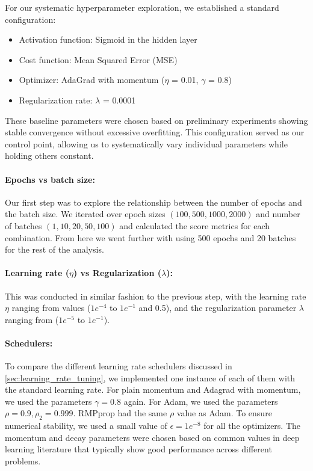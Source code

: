 For our systematic hyperparameter exploration, we established a standard configuration:
\begin{itemize}
    \item Activation function: Sigmoid in the hidden layer
    \item Cost function: Mean Squared Error (MSE)
    \item Optimizer: AdaGrad with momentum (\( \eta \) = 0.01, \( \gamma \) = 0.8)
    \item Regularization rate: \( \lambda \) = 0.0001
\end{itemize}

These baseline parameters were chosen based on preliminary experiments showing stable convergence without excessive overfitting. This configuration served as our control point, allowing us to systematically vary individual parameters while holding others constant.

\paragraph*{Epochs vs batch size:}
Our first step was to explore the relationship between the number of epochs and the batch size. We iterated over epoch sizes \( (100, 500, 1000, 2000) \) and number of batches \( (1, 10, 20, 50, 100) \) and calculated the score metrics for each combination. From here we went further with using 500 epochs and 20 batches for the rest of the analysis.

\paragraph*{Learning rate (\( \eta \)) vs Regularization (\( \lambda \)):}
This was conducted in similar fashion to the previous step, with the learning rate \( \eta \) ranging from values (\( 1e^{-4} \) to \( 1e^{-1} \) and 0.5), and the regularization parameter \( \lambda \) ranging from (\( 1e^{-5} \) to \( 1e^{-1} \)).

\paragraph*{Schedulers:}\label{subsec:nn_schedulers}
To compare the different learning rate schedulers discussed in \cref{sec:learning_rate_tuning}, we implemented one instance of each of them with the standard learning rate. For plain momentum and Adagrad with momentum, we used the parameters \( \gamma = 0.8 \) again. For Adam, we used the parameters \( \rho = 0.9, \rho_2 = 0.999 \). RMPprop had the same \( \rho \) value as Adam. To ensure numerical stability, we used a small value of \( \epsilon = 1e^{-8} \) for all the optimizers. The momentum and decay parameters were chosen based on common values in deep learning literature that typically show good performance across different problems.

